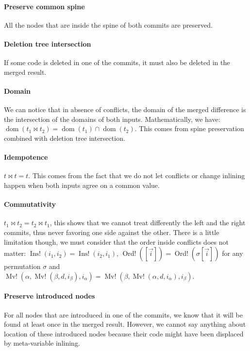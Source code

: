 \documentclass[a4paper,11pt]{article}
\newcommand\merge{\mathbin{\Join}}
\DeclareMathOperator\InsConflict{Ins!}
\DeclareMathOperator\OrdConflict{Ord!}
\DeclareMathOperator\MvConflict{Mv!}
\DeclareMathOperator\dom{dom}
\begin{document}
\paragraph{Preserve common spine}
All the nodes that are inside the spine of both commits are preserved.

\paragraph{Deletion tree intersection}
If some code is deleted in one of the commits, it must also be deleted in the
merged result.

\paragraph{Domain}
We can notice that in absence of conflicts, the domain of the
merged difference is the intersection of the domains of both
inputs. Mathematically, we have: $\dom(t_1 \merge t_2) = \dom(t_1)
\cap \dom(t_2)$. This comes from spine preservation combined with
deletion tree intersection.

\paragraph{Idempotence}
$t \merge t = t$. This comes from the fact that we do not let
conflicts or change inlining happen when both inputs agree on a common value.

\paragraph{Commutativity}
$t_1 \merge t_2 = t_2 \merge t_1$, this shows that we cannot treat differently
the left and the right commits, thus never favoring one side against the other.
There is a little limitation though, we must consider that the order inside
conflicts does not matter: $\InsConflict(i_1, i_2) = \InsConflict(i_2,
i_1)$, $\OrdConflict([\overrightarrow{i}]) =
\OrdConflict(\sigma[\overrightarrow{i}])$ for any permutation $\sigma$
and $\MvConflict(\alpha, \MvConflict(\beta, d, i_\beta), i_\alpha) =
\MvConflict(\beta, \MvConflict(\alpha, d, i_\alpha), i_\beta)$.

\paragraph{Preserve introduced nodes}
For all nodes that are introduced in one of the commits, we know that it will be
found at least once in the merged result. However, we cannot say anything about
location of these introduced nodes because their code might have been displaced
by meta-variable inlining.
\end{document}
